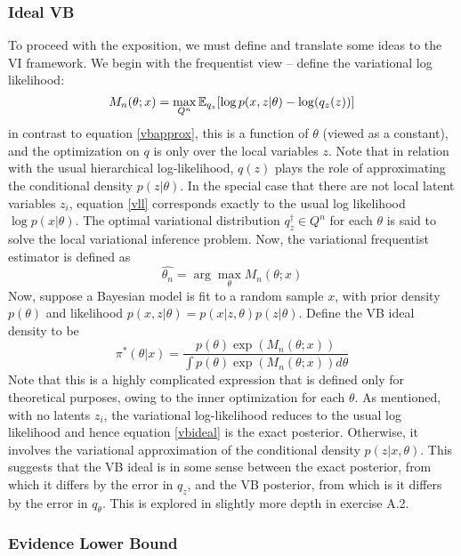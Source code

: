 \subsubsection{Ideal VB}
To proceed with the exposition, we must define and translate some ideas to the VI framework. We begin with the frequentist view -- define the variational log likelihood:
\begin{equation}
\label{vll}
M_n(\theta; x) = \max_{Q^n} \mathbb{E}_{q_z}[\log p(x,z|\theta) - \log(q_z(z))]
\end{equation}
%
in contrast to equation \ref{vbapprox}, this is a function of $\theta$ (viewed as a constant), and the optimization on $q$ is only over the local variables $z$. Note that in relation with the usual hierarchical log-likelihood, $q(z)$ plays the role of approximating the conditional density $p(z|\theta)$. In the special case that there are not local latent variables $z_i$, equation \ref{vll} corresponds exactly to the usual log likelihood $\log p(x|\theta)$. The optimal variational distribution $q_z^{\dagger} \in Q^n$ for each $\theta$ is said to solve the local variational inference problem. Now, the variational frequentist estimator is defined as
\begin{equation}
\hat{\theta_n} = \arg \max_{\theta} M_n(\theta; x)
\end{equation}
Now, suppose a Bayesian model is fit to a random sample $x$, with prior density $p(\theta)$ and likelihood $p(x, z | \theta) = p(x|z, \theta)p(z|\theta)$. Define the VB ideal density to be
\begin{equation}
\label{vbideal}
\pi^*(\theta|x) = \frac{p(\theta)\exp(M_n(\theta; x))}{\int p(\theta)\exp(M_n(\theta;x))d\theta}
\end{equation}
%
Note that this is a highly complicated expression that is defined only for theoretical purposes, owing to the inner optimization for each $\theta$. As mentioned, with no latents $z_i$, the variational log-likelihood reduces to the usual log likelihood and hence equation \ref{vbideal} is the exact posterior. Otherwise, it involves the variational approximation of the conditional density $p(z|x, \theta)$. This suggests that the VB ideal is in some sense between the exact posterior, from which it differs by the error in $q_z$, and the VB posterior, from which is it differs by the error in $q_\theta$. This is explored in slightly more depth in exercise A.2. 

\subsubsection{Evidence Lower Bound}

